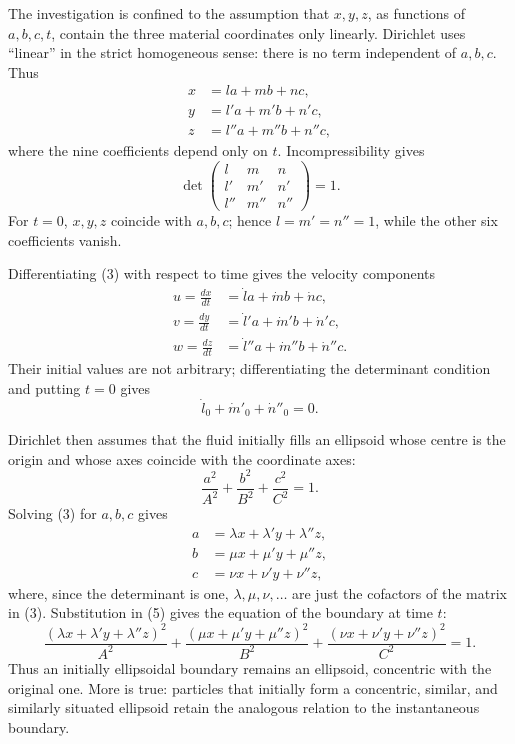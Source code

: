 \documentclass[11pt]{article}
\newcommand{\td}[1]{\frac{d #1}{dt}}
\begin{document}
The investigation is confined to the assumption that \(x,y,z\), as functions of \(a,b,c,t\), contain the three material coordinates only linearly.  Dirichlet uses ``linear'' in the strict homogeneous sense: there is no term independent of \(a,b,c\).  Thus
\begin{equation}
\begin{aligned}
 x&=la+mb+nc,\\
 y&=l'a+m'b+n'c,\\
 z&=l''a+m''b+n''c,
\end{aligned}
\end{equation}
where the nine coefficients depend only on \(t\).  Incompressibility gives
\begin{equation}
 \det\begin{pmatrix}l&m&n\\ l'&m'&n'\\ l''&m''&n''\end{pmatrix}=1.
\end{equation}
For \(t=0\), \(x,y,z\) coincide with \(a,b,c\); hence \(l=m'=n''=1\), while the other six coefficients vanish.

Differentiating (3) with respect to time gives the velocity components
\begin{equation}
\begin{aligned}
 u=\td{x}&=\dot l a+\dot m b+\dot n c,\\
 v=\td{y}&=\dot l'a+\dot m'b+\dot n'c,\\
 w=\td{z}&=\dot l''a+\dot m''b+\dot n''c.
\end{aligned}
\end{equation}
Their initial values are not arbitrary; differentiating the determinant condition and putting \(t=0\) gives
\[
 \dot l_0+\dot m'_0+\dot n''_0=0.
\]

Dirichlet then assumes that the fluid initially fills an ellipsoid whose centre is the origin and whose axes coincide with the coordinate axes:
\begin{equation}
 \frac{a^2}{A^2}+\frac{b^2}{B^2}+\frac{c^2}{C^2}=1.
\end{equation}
Solving (3) for \(a,b,c\) gives
\begin{equation}
\begin{aligned}
 a&=\lambda x+\lambda' y+\lambda'' z,\\
 b&=\mu x+\mu' y+\mu'' z,\\
 c&=\nu x+\nu' y+\nu'' z,
\end{aligned}
\end{equation}
where, since the determinant is one, \(\lambda,\mu,\nu,\ldots\) are just the cofactors of the matrix in (3).  Substitution in (5) gives the equation of the boundary at time \(t\):
\begin{equation}
 \frac{(\lambda x+\lambda' y+\lambda''z)^2}{A^2}
 +\frac{(\mu x+\mu' y+\mu''z)^2}{B^2}
 +\frac{(\nu x+\nu' y+\nu''z)^2}{C^2}=1.
\end{equation}
Thus an initially ellipsoidal boundary remains an ellipsoid, concentric with the original one.  More is true: particles that initially form a concentric, similar, and similarly situated ellipsoid retain the analogous relation to the instantaneous boundary.
\end{document}
